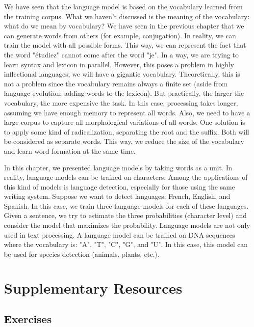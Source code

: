 \documentclass{KBook}
\begin{document}
We have seen that the language model is based on the vocabulary learned from the training corpus. What we haven't discussed is the meaning of the vocabulary: what do we mean by vocabulary? We have seen in the previous chapter that we can generate words from others (for example, conjugation). In reality, we can train the model with all possible forms. This way, we can represent the fact that the word "étudiez" cannot come after the word "je". In a way, we are trying to learn syntax and lexicon in parallel. However, this poses a problem in highly inflectional languages; we will have a gigantic vocabulary. Theoretically, this is not a problem since the vocabulary remains always a finite set (aside from language evolution: adding words to the lexicon). But practically, the larger the vocabulary, the more expensive the task. In this case, processing takes longer, assuming we have enough memory to represent all words. Also, we need to have a large corpus to capture all morphological variations of all words. One solution is to apply some kind of radicalization, separating the root and the suffix. Both will be considered as separate words. This way, we reduce the size of the vocabulary and learn word formation at the same time.

In this chapter, we presented language models by taking words as a unit. In reality, language models can be trained on characters. Among the applications of this kind of models is language detection, especially for those using the same writing system. Suppose we want to detect languages: French, English, and Spanish. In this case, we train three language models for each of these languages. Given a sentence, we try to estimate the three probabilities (character level) and consider the model that maximizes the probability. Language models are not only used in text processing. A language model can be trained on DNA sequences where the vocabulary is: "A", "T", "C", "G", and "U". In this case, this model can be used for species detection (animals, plants, etc.).


\section{Supplementary Resources}

\subsection*{Exercises}
\end{document}
